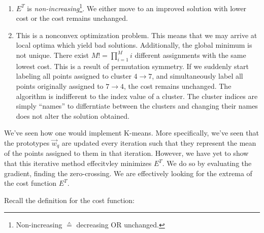 \begin{enumerate}
\item $E^T$ is \emph{non-increasing}\footnote{Non-increasing $\corresponds$ decreasing OR unchanged.}. We either move to an improved solution with lower cost or the cost remains unchanged.
\item This is a nonconvex optimization problem. This means that we may arrive at local optima which yield bad solutions. Additionally, the global minimum is not unique. There exist $M! = \prod_{i=1}^{M} i$ different assignments with the same lowest cost. This is a result of permutation symmetry. If we suddenly start labeling all points assigned to cluster $4 \rightarrow 7$, and simultaneously label all points originally assigned to $7 \rightarrow 4$, the cost remains unchanged. 
The algorithm is indifferent to the index value of a cluster. The cluster indices are simply ``names'' to differntiate between the clusters and changing their names does not alter the solution obtained.
 
\end{enumerate}

\begin{frame}



\end{frame}

We've seen how one would implement K-means. More specifically, we've seen that the prototypes $\vec w_q$ are updated every iteration such that they represent the mean of the points assigned to them in that iteration. However, we have yet to show that this iterative method effecitvley minimizes $E^T$. We do so by evaluating the gradient, finding the zero-crossing. We are effectively looking for the extrema of the cost function $E^T$.

Recall the definition for the cost function:

